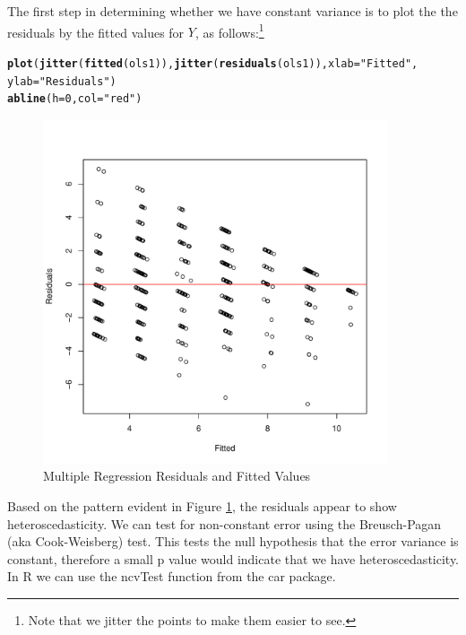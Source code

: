 \documentclass[11pt,openany]{book}\usepackage[]{graphicx}\usepackage[]{color}
\makeatletter
\newcommand{\hlnum}[1]{\textcolor[rgb]{0.686,0.059,0.569}{#1}}%
\newcommand{\hlstr}[1]{\textcolor[rgb]{0.192,0.494,0.8}{#1}}%
\newcommand{\hlstd}[1]{\textcolor[rgb]{0.345,0.345,0.345}{#1}}%
\newcommand{\hlkwc}[1]{\textcolor[rgb]{0.333,0.667,0.333}{#1}}%
\newcommand{\hlkwd}[1]{\textcolor[rgb]{0.737,0.353,0.396}{\textbf{#1}}}%
\newenvironment{kframe}{%
 \def\at@end@of@kframe{}%
 \ifinner\ifhmode%
  \def\at@end@of@kframe{\end{minipage}}%
  \begin{minipage}{\columnwidth}%
 \fi\fi%
 \def\FrameCommand##1{\hskip\@totalleftmargin \hskip-\fboxsep
 \colorbox{shadecolor}{##1}\hskip-\fboxsep
     \hskip-\linewidth \hskip-\@totalleftmargin \hskip\columnwidth}%
 \MakeFramed {\advance\hsize-\width
   \@totalleftmargin\z@ \linewidth\hsize
   \@setminipage}}%
 {\par\unskip\endMakeFramed%
 \at@end@of@kframe}
\newenvironment{knitrout}{}{} %
\renewenvironment{knitrout}{\begin{singlespace}}{\end{singlespace}} %
\makeatother
\begin{document}
The first step in determining whether we have constant variance is to plot the the residuals by the fitted values for $Y$, as follows:\footnote{Note that we jitter the points to make them easier to see.}

\begin{knitrout}
\color{fgcolor}\begin{kframe}
\begin{alltt}
\hlkwd{plot}\hlstd{(}\hlkwd{jitter}\hlstd{(}\hlkwd{fitted}\hlstd{(ols1)),} \hlkwd{jitter}\hlstd{(}\hlkwd{residuals}\hlstd{(ols1)),} \hlkwc{xlab} \hlstd{=} \hlstr{"Fitted"}\hlstd{,}
    \hlkwc{ylab} \hlstd{=} \hlstr{"Residuals"}\hlstd{)}
\hlkwd{abline}\hlstd{(}\hlkwc{h} \hlstd{=} \hlnum{0}\hlstd{,} \hlkwc{col} \hlstd{=} \hlstr{"red"}\hlstd{)}
\end{alltt}
\end{kframe}
\end{knitrout}

\begin{figure}
        \centering
        \includegraphics[width=4in]{15_Diagnostics/multregres.pdf}%
        \caption{Multiple Regression Residuals and Fitted Values \label{fig:multregres}}
\end{figure}

\noindent Based on the pattern evident in Figure \ref{fig:multregres}, the residuals
appear to show heteroscedasticity. We can test for non-constant error using the Breusch-Pagan (aka Cook-Weisberg) test. This tests the null hypothesis that the error variance is constant, therefore a small p value would indicate that we have heteroscedasticity. In R we can use the ncvTest function from the car package.
\end{document}
